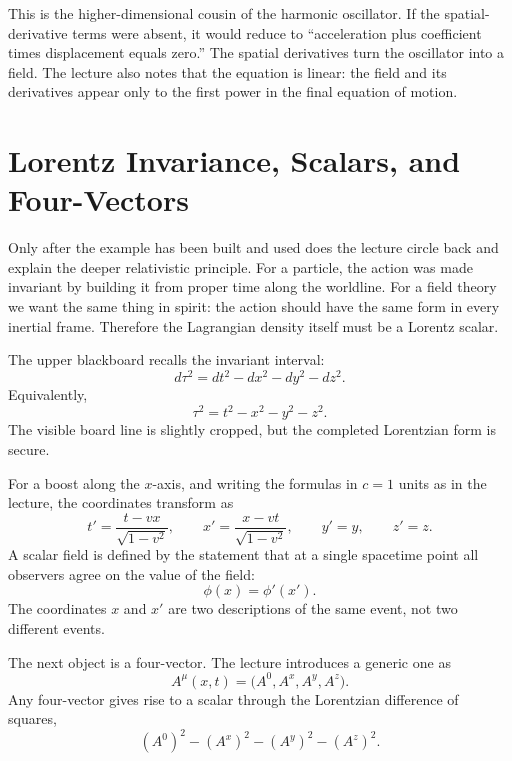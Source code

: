 This is the higher-dimensional cousin of the harmonic oscillator. If the spatial-derivative terms were absent, it would reduce to ``acceleration plus coefficient times displacement equals zero.'' The spatial derivatives turn the oscillator into a field. The lecture also notes that the equation is linear: the field and its derivatives appear only to the first power in the final equation of motion.

\section{Lorentz Invariance, Scalars, and Four-Vectors}

Only after the example has been built and used does the lecture circle back and explain the deeper relativistic principle. For a particle, the action was made invariant by building it from proper time along the worldline. For a field theory we want the same thing in spirit: the action should have the same form in every inertial frame. Therefore the Lagrangian density itself must be a Lorentz scalar.

The upper blackboard recalls the invariant interval:
\begin{equation}
d\tau^2=dt^2-dx^2-dy^2-dz^2.
\end{equation}
Equivalently,
\begin{equation}
\tau^2=t^2-x^2-y^2-z^2.
\end{equation}
The visible board line is slightly cropped, but the completed Lorentzian form is secure.

For a boost along the \(x\)-axis, and writing the formulas in \(c=1\) units as in the lecture, the coordinates transform as
\begin{equation}
t'=\frac{t-vx}{\sqrt{1-v^2}},
\qquad
x'=\frac{x-vt}{\sqrt{1-v^2}},
\qquad
y'=y,
\qquad
z'=z.
\end{equation}
A scalar field is defined by the statement that at a single spacetime point all observers agree on the value of the field:
\begin{equation}
\phi(x)=\phi'(x').
\end{equation}
The coordinates \(x\) and \(x'\) are two descriptions of the same event, not two different events.

The next object is a four-vector. The lecture introduces a generic one as
\begin{equation}
A^\mu(x,t)=\bigl(A^0,A^x,A^y,A^z\bigr).
\end{equation}
Any four-vector gives rise to a scalar through the Lorentzian difference of squares,
\begin{equation}
(A^0)^2-(A^x)^2-(A^y)^2-(A^z)^2.
\end{equation}

